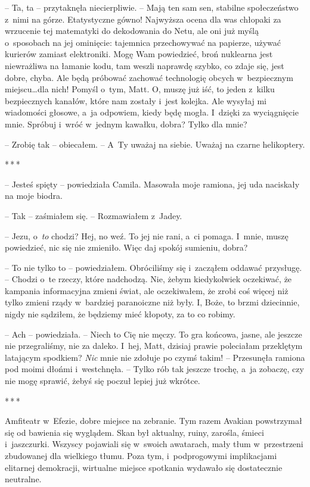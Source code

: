 \documentclass[oneside,polish,12pt,sfheadings]{mwbk}
\newcommand{\threeast}{\bigskip\par\centerline{*\,*\,*}\medskip\par}%
\begin{document}
-- Ta, ta -- przytaknęła niecierpliwie. -- Mają ten sam sen, stabilne
społeczeństwo z~nimi na górze. Etatystyczne gówno! Najwyższa ocena dla
was chłopaki za wrzucenie tej matematyki do dekodowania do Netu, ale oni
już myślą o~sposobach na jej ominięcie: tajemnica przechowywać na
papierze, używać kurierów zamiast elektroniki. Mogę Wam powiedzieć, broń
nuklearna jest niewrażliwa na łamanie kodu, tam weszli naprawdę szybko,
co zdaje się, jest dobre, chyba. Ale będą próbować zachować technologię
obcych w~bezpiecznym miejscu\ldots dla nich! Pomyśl o~tym, Matt. O, muszę już iść, to jeden z~kilku bezpiecznych
kanałów, które nam zostały i~jest kolejka. Ale wysyłaj mi wiadomości
głosowe, a~ja odpowiem, kiedy będę mogła. I~dzięki za wyciągnięcie mnie.
Spróbuj i~wróć w~jednym kawałku, dobra? Tylko dla mnie?

-- Zrobię tak -- obiecałem. -- A~Ty uważaj na siebie. Uważaj na czarne
helikoptery.

\threeast

-- Jesteś spięty -- powiedziała Camila. Masowała moje ramiona, jej uda
naciskały na moje biodra.

-- Tak -- zaśmiałem się. -- Rozmawiałem z~Jadey.

-- Jezu, o~\emph{to} chodzi? Hej, no weź. To jej nie rani, a~ci pomaga. I~mnie, muszę powiedzieć, nic się nie zmieniło. Więc daj spokój sumieniu,
dobra?

-- To nie tylko to -- powiedziałem. Obróciliśmy się i~zacząłem oddawać
przysługę. -- Chodzi o~te rzeczy, które nadchodzą. Nie, żebym
kiedykolwiek oczekiwać, że kampania informacyjna zmieni świat, ale
oczekiwałem, że zrobi coś więcej niż tylko zmieni rządy w~bardziej
paranoiczne niż były. I, Boże, to brzmi dziecinnie, nigdy nie sądziłem,
że będziemy mieć kłopoty, za to co robimy.

-- Ach -- powiedziała. -- Niech to Cię nie męczy. To gra końcowa, jasne,
ale jeszcze nie przegraliśmy, nie za daleko. I~hej, Matt, dzisiaj prawie
poleciałam przeklętym latającym spodkiem? \emph{Nic} mnie nie zdołuje po
czymś takim! -- Przesunęła ramiona pod moimi dłońmi i~westchnęła. -- Tylko
rób tak jeszcze trochę, a~ja zobaczę, czy nie mogę sprawić, żebyś się
poczuł lepiej już wkrótce.

\threeast

Amfiteatr w~Efezie, dobre miejsce na zebranie. Tym razem Avakian
powstrzymał się od bawienia się wyglądem. Skan był aktualny, ruiny,
zarośla, śmieci i~jaszczurki. Wszyscy pojawiali się w~swoich awatarach,
mały tłum w~przestrzeni zbudowanej dla wielkiego tłumu. Poza tym, i~podprogowymi implikacjami elitarnej demokracji, wirtualne miejsce
spotkania wydawało się dostatecznie neutralne.
\end{document}

